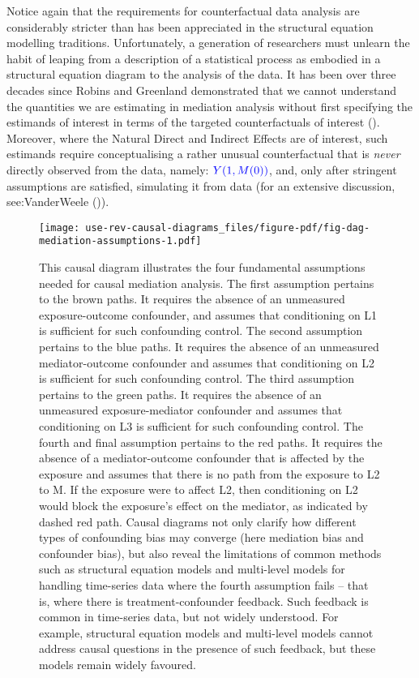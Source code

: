 \documentclass[
  singlecolumn,
  9pt]{article}
\begin{document}
Notice again that the requirements for counterfactual data analysis are
considerably stricter than has been appreciated in the structural
equation modelling traditions. Unfortunately, a generation of
researchers must unlearn the habit of leaping from a description of a
statistical process as embodied in a structural equation diagram to the
analysis of the data. It has been over three decades since Robins and
Greenland demonstrated that we cannot understand the quantities we are
estimating in mediation analysis without first specifying the estimands
of interest in terms of the targeted counterfactuals of interest
(). Moreover, where
the Natural Direct and Indirect Effects are of interest, such estimands
require conceptualising a rather unusual counterfactual that is
\emph{never} directly observed from the data, namely:
\(\textcolor{blue}{Y(1, M(0))}\), and, only after stringent assumptions
are satisfied, simulating it from data (for an extensive discussion,
see:VanderWeele ()).

\begin{figure}

{\centering \texttt{[image: use-rev-causal-diagrams\_files/figure-pdf/fig-dag-mediation-assumptions-1.pdf]}

}

\caption{\label{fig-dag-mediation-assumptions}This causal diagram
illustrates the four fundamental assumptions needed for causal mediation
analysis. The first assumption pertains to the brown paths. It requires
the absence of an unmeasured exposure-outcome confounder, and assumes
that conditioning on L1 is sufficient for such confounding control. The
second assumption pertains to the blue paths. It requires the absence of
an unmeasured mediator-outcome confounder and assumes that conditioning
on L2 is sufficient for such confounding control. The third assumption
pertains to the green paths. It requires the absence of an unmeasured
exposure-mediator confounder and assumes that conditioning on L3 is
sufficient for such confounding control. The fourth and final assumption
pertains to the red paths. It requires the absence of a mediator-outcome
confounder that is affected by the exposure and assumes that there is no
path from the exposure to L2 to M. If the exposure were to affect L2,
then conditioning on L2 would block the exposure's effect on the
mediator, as indicated by dashed red path. Causal diagrams not only
clarify how different types of confounding bias may converge (here
mediation bias and confounder bias), but also reveal the limitations of
common methods such as structural equation models and multi-level models
for handling time-series data where the fourth assumption fails -- that
is, where there is treatment-confounder feedback. Such feedback is
common in time-series data, but not widely understood. For example,
structural equation models and multi-level models cannot address causal
questions in the presence of such feedback, but these models remain
widely favoured.}

\end{figure}
\end{document}
